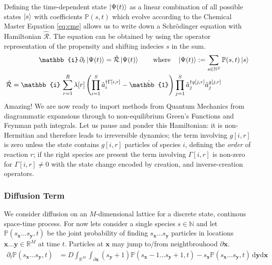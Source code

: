 \documentclass{article}[12pt]
\numberwithin{equation}{section}
\begin{document}
Defining the time-dependent state $\ket{\Psi(t)}$ as a linear combination of all possible
states $\ket{s}$ with coefficients $\mathbb{P}(s,t)$ which evolve according to
the Chemical Master Equation \eqref{eq:cme} allows us to write down a Schr\"odinger
equation with Hamiltonian $\hat{\mathcal{R}}$. The equation can be obtained by using
the operator representation of the propensity and shifting indecies $s$ in the sum.
\begin{align}
	\mathbb{i}\,\partial_t\ket{\Psi(t)}
	=\hat{\mathcal{R}}\ket{\Psi(t)}
	\qquad\text{where}\quad
	\ket{\Psi(t)}:=\sum_{s\in\mathbb{N}^S}\mathbb{P}(s,t)\ket{s}
	\label{eq:reactionschrodinger}
\\
	\hat{\mathcal{R}} = \mathbb{i}\,
	\sum_{r=1}^R
		\lambda[r]
		\left(
			\prod_{i=1}^S\hat{a}_i^{\dagger\Gamma[i,r]}
			-
			\hat{\mathbb{1}}
		\right)
		\prod_{j=1}^S
			\hat{a}_j^{\dagger g[j,r]}
			\hat{a}_j^{g[j,r]}
	\qquad\qquad
	\label{eq:reactionhamiltonian}
\end{align}
Amazing! We are now ready to import methods from Quantum Mechanics from
diagrammatic expansions through to non-equilibrium Green's Functions and Feynman
path integrals. Let us pause and ponder this Hamiltonian: it is non-Hermitian
and therefore leads to irreversible dynamics; the term involving $g[i,r]$ is
zero unless the state contains $g[i,r]$ particles of species $i$, defining the
\textit{order} of reaction $r$; if the right species are present the term
involving $\Gamma[i,r]$ is non-zero for  $\Gamma[i,r]\neq 0$ with the state
change encoded by creation, and inverse-creation operators.
\vspace{-10pt}\subsubsection{Diffusion Term}\vspace{-10pt}
We consider diffusion on an $M$-dimensional lattice for a discrete state,
continous space-time process. For now lets consider a single species
$s\in\mathbb{N}$ and let $\mathbb{P}(s_{\mathbf{x}}\dots s_{\mathbf{y}},t)$ be
the joint probability of finding $s_{\mathbf{x}}\dots s_{\mathbf{y}}$ particles
in locations $\mathbf{x}\dots\mathbf{y}\in\mathbb{R}^M$ at time $t$. Particles
at $\mathbf{x}$ may jump to/from neightbrouhood $\partial\mathbf{x}$.
\begin{align}
	\partial_t \mathbb{P}(s_{\mathbf{x}}\dots s_{\mathbf{y}},t) &=
	D\int_{\mathbb{R}^{M}}\int_{\partial\mathbf{x}}\!
	(s_{\mathbf{y}}+1)\mathbb{P}(s_{\mathbf{x}}-1\dots s_{\mathbf{y}}+1,t)
	-
	s_{\mathbf{x}}\mathbb{P}(s_{\mathbf{x}}\dots s_{\mathbf{y}},t)
	\,\mathrm{d}\mathbf{y}\mathrm{d}\mathbf{x}
\end{align}
\end{document}

